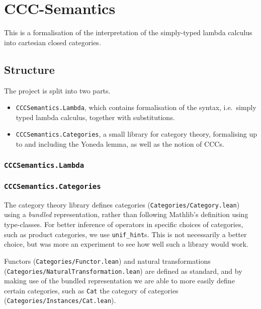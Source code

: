 \hypertarget{ccc-semantics}{%
\section{CCC-Semantics}\label{ccc-semantics}}

This is a formalisation of the interpretation of the simply-typed lambda
calculus into cartesian closed categories.

\hypertarget{structure}{%
\subsection{Structure}\label{structure}}

The project is split into two parts.

\begin{itemize}
\tightlist
\item
  \texttt{CCCSemantics.Lambda}, which contains formalisation of the
  syntax, i.e.~simply typed lambda calculus, together with
  substitutions.
\item
  \texttt{CCCSemantics.Categories}, a small library for category theory,
  formalising up to and including the Yoneda lemma, as well as the
  notion of CCCs.
\end{itemize}

\hypertarget{cccsemantics.lambda}{%
\subsubsection{\texorpdfstring{\texttt{CCCSemantics.Lambda}}{CCCSemantics.Lambda}}\label{cccsemantics.lambda}}

\hypertarget{cccsemantics.categories}{%
\subsubsection{\texorpdfstring{\texttt{CCCSemantics.Categories}}{CCCSemantics.Categories}}\label{cccsemantics.categories}}

The category theory library defines categories
(\texttt{Categories/Category.lean}) using a \emph{bundled}
representation, rather than following Mathlib's definition using
type-classes. For better inference of operators in specific choices of
categories, such as product categories, we use \texttt{unif\_hint}s.
This is not necessarily a better choice, but was more an experiment to
see how well such a library would work.

Functors (\texttt{Categories/Functor.lean}) and natural transformations
(\texttt{Categories/NaturalTransformation.lean}) are defined as
standard, and by making use of the bundled representation we are able to
more easily define certain categories, such as \texttt{Cat} the category
of categories (\texttt{Categories/Instances/Cat.lean}).

